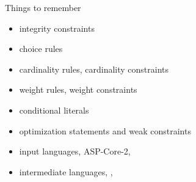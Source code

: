 \begin{frame}{Things to remember}
  \bigskip
  \begin{itemize}
  \item integrity constraints
  \item choice rules
  \item cardinality rules, cardinality constraints
  \item weight rules, weight constraints
    \medskip
  \item conditional literals
    \medskip
  \item optimization statements and weak constraints
    \medskip
  \item input languages, ASP-Core-2, \gringo\
  \item intermediate languages, \smodels, \aspif\
  \end{itemize}
\end{frame}
%
